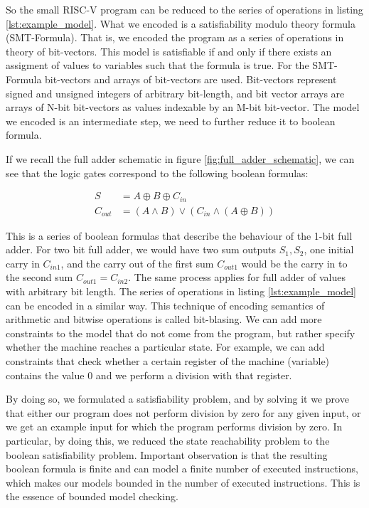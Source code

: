 \documentclass[12pt]{article}
\begin{document}
So the small RISC-V program can be reduced to the series of operations in
listing \ref{lst:example_model}. What we encoded is a satisfiability modulo
theory formula (SMT-Formula). That is, we encoded the program as a series of
operations in theory of bit-vectors. This model is satisfiable if and only if
there exists an assigment of values to variables such that the formula is true.
For the SMT-Formula bit-vectors and arrays of bit-vectors are used. Bit-vectors
represent signed and unsigned integers of arbitrary bit-length, and bit vector
arrays are arrays of N-bit bit-vectors as values indexable by an M-bit
bit-vector. The model we encoded is an intermediate step, we need to further
reduce it to boolean formula.

If we recall the full adder schematic in figure \ref{fig:full_adder_schematic},
we can see that the logic gates correspond to the following boolean formulas:

\begin{align*}
    S	    &= A \oplus B \oplus C_{in} \\
    C_{out} &= (A \land B) \lor (C_{in} \land (A \oplus B))
\end{align*}

This is a series of boolean formulas that describe the behaviour of the 1-bit
full adder. For two bit full adder, we would have two sum outputs $S_1, S_2$,
one initial carry in $C_{in1}$, and the carry out of the first sum $C_{out1}$
would be the carry in to the second sum $C_{out1} = C_{in2}$. The same process
applies for full adder of values with arbitrary bit length. The series of
operations in listing \ref{lst:example_model} can be encoded in a similar
way. This technique of encoding semantics of arithmetic and bitwise operations
is called bit-blasing. We can add more constraints to the model that do not
come from the program, but rather specify whether the machine reaches a
particular state. For example, we can add constraints that check whether a
certain register of the machine (variable) contains the value $0$ and we
perform a division with that register. 

By doing so, we formulated a satisfiability problem, and by solving it we prove
that either our program does not perform division by zero for any given input,
or we get an example input for which the program performs division by zero. In
particular, by doing this, we reduced the state reachability problem to the
boolean satisfiability problem. Important observation is that the resulting 
boolean formula is finite and can model a finite number of executed
instructions, which makes our models bounded in the number of executed
instructions. This is the essence of bounded model checking.
\end{document}

